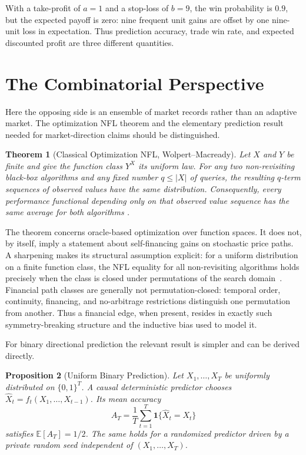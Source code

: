\documentclass[aps,pra,reprint,superscriptaddress,amsmath,amssymb,floatfix]{revtex4-2}
\theoremstyle{plain}
\newtheorem{theorem}{Theorem}
\newtheorem{proposition}[theorem]{Proposition}
\theoremstyle{definition}
\theoremstyle{remark}
\begin{document}
With a take-profit of \(a=1\) and a stop-loss of \(b=9\), the win probability
is \(0.9\), but the expected payoff is zero: nine frequent unit gains are
offset by one nine-unit loss in expectation. Thus prediction accuracy, trade
win rate, and expected discounted profit are three different quantities.

\section{The Combinatorial Perspective}
\label{sec:nfl}

Here the opposing side is an ensemble of market records rather than an
adaptive market. The optimization NFL theorem and the elementary prediction
result needed for market-direction claims should be distinguished.

\begin{theorem}[Classical Optimization NFL, Wolpert--Macready]
  \label{thm:nfl}
  Let \(X\) and \(Y\) be finite and give the function class \(Y^X\) its uniform
  law. For any two non-revisiting black-box algorithms and any fixed number
  \(q\leq |X|\) of queries, the resulting \(q\)-term sequences of observed
  values have the same distribution. Consequently, every performance
  functional depending only on that observed value sequence has the same
  average for both algorithms
  \cite{Wolpert:1997:NFL:2221336.2221408}.
\end{theorem}

The theorem concerns oracle-based optimization over function spaces. It does
not, by itself, imply a statement about self-financing gains on stochastic
price paths. A sharpening makes its structural assumption explicit: for a
uniform distribution on a finite function class, the NFL equality for all
non-revisiting algorithms holds precisely when the class is closed under
permutations of the search domain~\cite{SchumacherVoseWhitley2001}. Financial
path classes are generally not permutation-closed: temporal order, continuity,
financing, and no-arbitrage restrictions distinguish one permutation from
another. Thus a financial edge, when present, resides in exactly such
symmetry-breaking structure and the inductive bias used to model it.

For binary directional prediction the relevant result is simpler and can be
derived directly.

\begin{proposition}[Uniform Binary Prediction]
  \label{prop:binary}
  Let \(X_1,\ldots,X_T\) be uniformly distributed on \(\{0,1\}^T\). A causal
  deterministic predictor chooses
  \(\widehat X_t=f_t(X_1,\ldots,X_{t-1})\). Its mean accuracy
  \[
    A_T=\frac1T\sum_{t=1}^T
      \mathbf{1}\{\widehat X_t=X_t\}
  \]
  satisfies \(\mathbb{E}[A_T]=1/2\). The same holds for a randomized predictor
  driven by a private random seed independent of
  \((X_1,\ldots,X_T)\).
\end{proposition}
\end{document}
